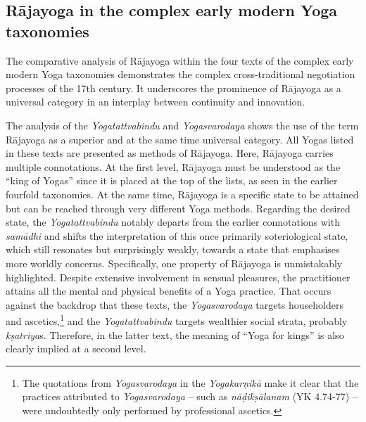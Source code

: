\subsection{Rājayoga in the complex early modern Yoga taxonomies}

The comparative analysis of Rājayoga within the four texts of the complex early modern Yoga taxonomies demonstrates the complex cross-traditional negotiation processes of the 17th century. It underscores the prominence of Rājayoga as a universal category in an interplay between continuity and innovation.

The analysis of the \emph{Yogatattvabindu} and \emph{Yogasvarodaya} shows the use of the term Rājayoga as a superior and at the same time universal category. All Yogas listed in these texts are presented as methods of Rājayoga. Here, Rājayoga carries multiple connotations. At the first level, Rājayoga must be understood as the ``king of Yogas'' since it is placed at the top of the lists, as seen in the earlier fourfold taxonomies. At the same time, Rājayoga is a specific state to be attained but can be reached through very different Yoga methods.
Regarding the desired state, the \emph{Yogatattvabindu} notably departs from the earlier connotations with \textit{samādhi} and shifts the interpretation of this once primarily soteriological state, which still resonates but surprisingly weakly, towards a state that emphasises more worldly concerns. Specifically, one property of Rājayoga is unmistakably highlighted. Despite extensive involvement in sensual pleasures, the practitioner attains all the mental and physical benefits of a Yoga practice. That occurs against the backdrop that these texts, the \emph{Yogasvarodaya} targets householders and ascetics,\footnote{The quotations from \emph{Yogasvarodaya} in the \emph{Yogakarṇikā} make it clear that the practices attributed to \emph{Yogasvarodaya} – such as \textit{nāḍikṣālanam} (YK 4.74-77) – were undoubtedly only performed by professional ascetics.} and the \emph{Yogatattvabindu} targets wealthier social strata, probably \textit{kṣatriya}s. Therefore, in the latter text, the meaning of ``Yoga for kings'' is also clearly implied at a second level.

